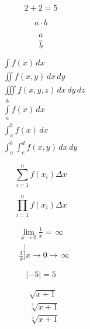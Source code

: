 \begin{equation}
    2 + 2 = 5
     \label{eq:test}
\end{equation}

\begin{center}
\begin{equation*}
	a\cdot b
\end{equation*}

\begin{equation*}
	\frac{a}{b}
\end{equation*}

\begin{align*}
	&\int f(x)\,dx\\
        &\iint f(x,y)\,dx\,dy\\
        &\iiint f(x,y,z)\,dx\,dy\,dz\\
        &\int\limits_{a}^{b}f(x)\,dx\\
        &\int_{a}^{b}f(x)\,dx\\
        &\int_{a}^{b}\int_{c}^{d}f(x,y)\,dx\,dy
\end{align*}

\begin{equation*}
	\sum_{i=1}^n f(x_i) \Delta x
\end{equation*}

\begin{equation*}
	\prod_{i=1}^n f(x_i) \Delta x
\end{equation*}

\begin{align*}
	&\lim_{x \to 0} \frac{1}{x} = \,\infty \\ 
        &\frac{1}{x}\stackrel[] {x \to 0}{\longrightarrow}\,\infty
\end{align*}

\begin{equation*}
	\lvert -5 \rvert=5
\end{equation*}

\begin{align*}
	&\sqrt{x+1}\\
        &\sqrt[3]{x+1}\\
        &\sqrt[4]{x+1}
\end{align*}


\end{center}
